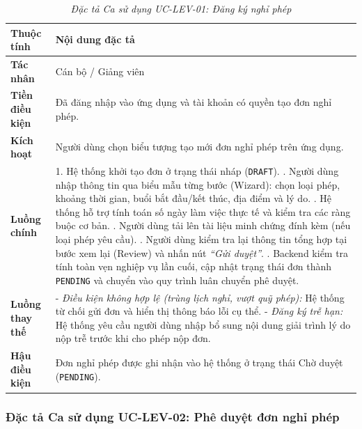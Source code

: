 \begin{table}[H]
\centering
\renewcommand{\arraystretch}{1.25}
\begin{tabularx}{\textwidth}{|p{3.2cm}|X|}
\hline
\textbf{Thuộc tính} & \textbf{Nội dung đặc tả} \\
\hline
\textbf{Tác nhân} & Cán bộ / Giảng viên \\
\hline
\textbf{Tiền điều kiện} & Đã đăng nhập vào ứng dụng và tài khoản có quyền tạo đơn nghỉ phép. \\
\hline
\textbf{Kích hoạt} & Người dùng chọn biểu tượng tạo mới đơn nghỉ phép trên ứng dụng. \\
\hline
\textbf{Luồng chính} & 
1. Hệ thống khởi tạo đơn ở trạng thái nháp (\texttt{DRAFT}). \newline
2. Người dùng nhập thông tin qua biểu mẫu từng bước (Wizard): chọn loại phép, khoảng thời gian, buổi bắt đầu/kết thúc, địa điểm và lý do. \newline
3. Hệ thống hỗ trợ tính toán số ngày làm việc thực tế và kiểm tra các ràng buộc cơ bản. \newline
4. Người dùng tải lên tài liệu minh chứng đính kèm (nếu loại phép yêu cầu). \newline
5. Người dùng kiểm tra lại thông tin tổng hợp tại bước xem lại (Review) và nhấn nút \textit{``Gửi duyệt''}. \newline
6. Backend kiểm tra tính toàn vẹn nghiệp vụ lần cuối, cập nhật trạng thái đơn thành \texttt{PENDING} và chuyển vào quy trình luân chuyển phê duyệt. \\
\hline
\textbf{Luồng thay thế} & 
- \textit{Điều kiện không hợp lệ (trùng lịch nghỉ, vượt quỹ phép):} Hệ thống từ chối gửi đơn và hiển thị thông báo lỗi cụ thể. \newline
- \textit{Đăng ký trễ hạn:} Hệ thống yêu cầu người dùng nhập bổ sung nội dung giải trình lý do nộp trễ trước khi cho phép nộp đơn. \\
\hline
\textbf{Hậu điều kiện} & Đơn nghỉ phép được ghi nhận vào hệ thống ở trạng thái Chờ duyệt (\texttt{PENDING}). \\
\hline
\end{tabularx}
\caption{\textit{Đặc tả Ca sử dụng UC-LEV-01: Đăng ký nghỉ phép}}
\label{tab:uc_lev_01}
\end{table}

\subsubsection{Đặc tả Ca sử dụng UC-LEV-02: Phê duyệt đơn nghỉ phép}

